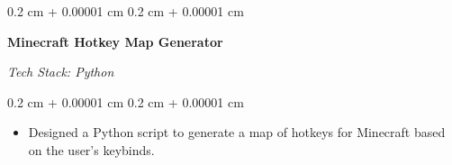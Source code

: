 \documentclass[10pt, a4paper]{article}
\newenvironment{highlights}{
    \begin{itemize}[
        topsep=0.1 cm,
        parsep=0.1 cm,
        partopsep=0pt,
        itemsep=0pt,
        leftmargin=0.4 cm + 10pt
    ]
}{
    \end{itemize}
} %
\newenvironment{onecolentry}{
    \begin{adjustwidth}{
        0.2 cm + 0.00001 cm
    }{
        0.2 cm + 0.00001 cm
    }
}{
    \end{adjustwidth}
} %
\newenvironment{twocolentry}[2][]{
    \onecolentry
    \def\secondColumn{#2}
    \begin{paracol}{2}
}{
    \switchcolumn \raggedleft \secondColumn
    \end{paracol}
    \endonecolentry
} %
\newcommand{\createpointblock}[5]{%
    \begin{twocolentry}{%
        \textit{#2}

        \textit{#4}}
        \textbf{#1}

        \textit{#3}
    \end{twocolentry}

    \vspace{0.1 cm}
    \begin{onecolentry}
        \begin{highlights}
            #5
        \end{highlights}
    \end{onecolentry}
}
\let\hrefWithoutArrow\href
\renewcommand{\href}[2]{\hrefWithoutArrow{#1}{\ifthenelse{\equal{#2}{}}{ }{#2 }\raisebox{.15ex}{\footnotesize \faExternalLink*}}}
\begin{document}



    \createpointblock{Minecraft Hotkey Map Generator\href{https://github.com/abdbbdii/minecraft-hotkey-map}{}}{}
    {Tech Stack: Python}{}
    {%
        \item Designed a Python script to generate a map of hotkeys for Minecraft based on the user's keybinds.
    }
\end{document}
